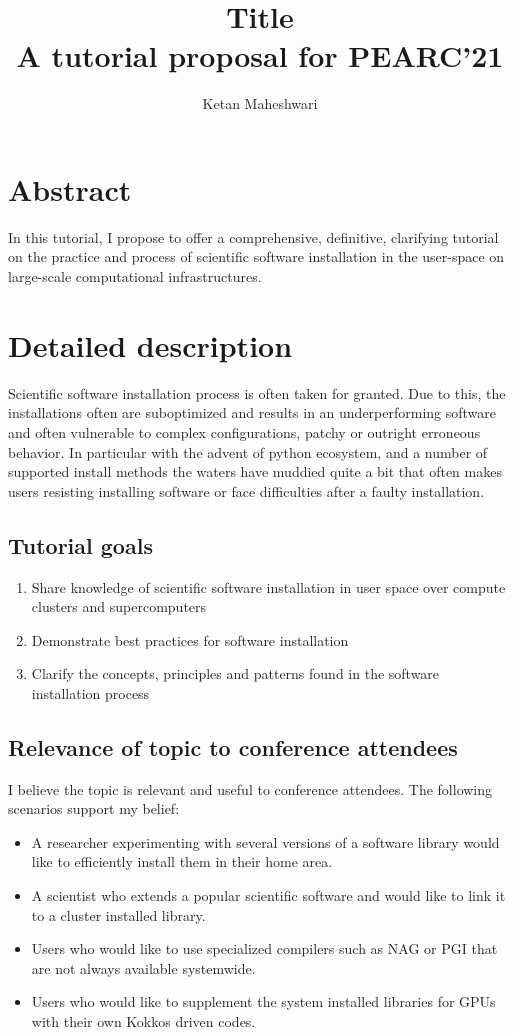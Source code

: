 \documentclass{report}
\title{ Title\\
       \large A tutorial proposal for PEARC'21
			 }
\author{Ketan Maheshwari}
\begin{document}
\maketitle
\section*{Abstract}
In this tutorial, I propose to offer a comprehensive, definitive, clarifying
tutorial on the practice and process of scientific software installation in the
user-space on large-scale computational infrastructures.

\section*{Detailed description}
Scientific software installation process is often taken for granted. Due to
this, the installations often are suboptimized and results in an
underperforming software and often vulnerable to complex configurations, patchy
or outright erroneous behavior.  In particular with the advent of python
ecosystem, and a number of supported install methods the waters have muddied
quite a bit that often makes users resisting installing software or face
difficulties after a faulty installation.

\subsection*{Tutorial goals}
\begin{enumerate}
\item Share knowledge of scientific software installation in user space over compute clusters and supercomputers
\item Demonstrate best practices for software installation 
\item Clarify the concepts, principles and patterns found in the software installation process
\end{enumerate}

\subsection*{Relevance of topic to conference attendees}
I believe the topic is relevant and useful to conference attendees. The following scenarios support my belief:
\begin{itemize}
\item A researcher experimenting with several versions of a software library would like to efficiently install them in their home area.
\item A scientist who extends a popular scientific software and would like to link it to a cluster installed library.
\item Users who would like to use specialized compilers such as NAG or PGI that are not always available systemwide.
\item Users who would like to supplement the system installed libraries for GPUs with their own Kokkos driven codes.
\end{itemize}
\end{document}

